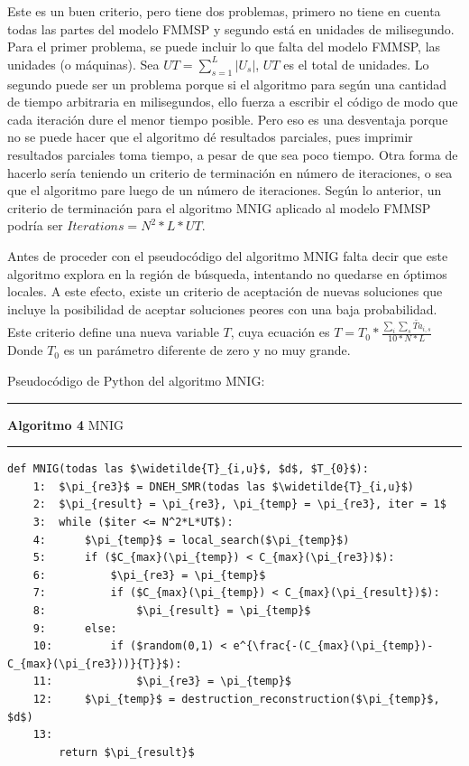 \documentclass{article}
\begin{document}
\vspace{\baselineskip}
Este es un buen criterio, pero tiene dos problemas, primero no tiene en cuenta todas las partes del modelo FMMSP y segundo está en unidades de milisegundo. Para el primer problema, se puede incluir lo que falta del modelo FMMSP, las unidades (o máquinas). Sea $UT = \sum_{s = 1}^{L}|U_{s}|$, $UT$ es el total de unidades. Lo segundo puede ser un problema porque si el algoritmo para según una cantidad de tiempo arbitraria en milisegundos, ello fuerza a escribir el código de modo que cada iteración dure el menor tiempo posible. Pero eso es una desventaja porque no se puede hacer que el algoritmo dé resultados parciales, pues imprimir resultados parciales toma tiempo, a pesar de que sea poco tiempo. Otra forma de hacerlo sería teniendo un criterio de terminación en número de iteraciones, o sea que el algoritmo pare luego de un número de iteraciones. Según lo anterior, un criterio de terminación para el algoritmo MNIG aplicado al modelo FMMSP podría ser $Iterations = N^2*L*UT$.

\vspace{\baselineskip}
Antes de proceder con el pseudocódigo del algoritmo MNIG falta decir que este algoritmo explora en la región de búsqueda, intentando no quedarse en óptimos locales. A este efecto, existe un criterio de aceptación de nuevas soluciones que incluye la posibilidad de aceptar soluciones peores con una baja probabilidad. Este criterio define una nueva variable $T$, cuya ecuación es $T = T_{0}*\frac{\sum_{i}\sum_{s}\widetilde{Ta}_{i,s}}{10*N*L}$ Donde $T_{0}$ es un parámetro diferente de zero y no muy grande. \autocite{algMNIG}

\vspace{\baselineskip}
Pseudocódigo de Python del algoritmo MNIG:

\noindent\noindent
\rule{\linewidth}{0.4pt}

\textbf{Algoritmo 4} MNIG

\noindent\noindent
\rule{\linewidth}{0.4pt}

\begin{lstlisting}[mathescape=true]
    def MNIG(todas las $\widetilde{T}_{i,u}$, $d$, $T_{0}$):
    1:  $\pi_{re3}$ = DNEH_SMR(todas las $\widetilde{T}_{i,u}$)
    2:  $\pi_{result} = \pi_{re3}, \pi_{temp} = \pi_{re3}, iter = 1$
    3:  while ($iter <= N^2*L*UT$):
    4:      $\pi_{temp}$ = local_search($\pi_{temp}$)
    5:      if ($C_{max}(\pi_{temp}) < C_{max}(\pi_{re3})$):
    6:          $\pi_{re3} = \pi_{temp}$
    7:          if ($C_{max}(\pi_{temp}) < C_{max}(\pi_{result})$):
    8:              $\pi_{result} = \pi_{temp}$
    9:      else:
    10:         if ($random(0,1) < e^{\frac{-(C_{max}(\pi_{temp})-C_{max}(\pi_{re3}))}{T}}$):
    11:             $\pi_{re3} = \pi_{temp}$
    12:     $\pi_{temp}$ = destruction_reconstruction($\pi_{temp}$, $d$)
    13:
        return $\pi_{result}$
\end{lstlisting}
\end{document}
